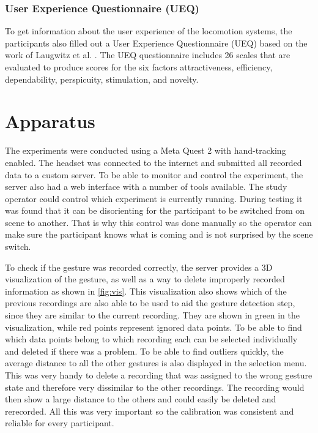\subsubsection{User Experience Questionnaire (UEQ)}
To get information about the user experience of the locomotion systems, the participants also filled out a User Experience Questionnaire (UEQ) based on the work of Laugwitz et al. \cite{Laugwitz2008}. The UEQ questionnaire includes 26 scales that are evaluated to produce scores for the six factors attractiveness, efficiency, dependability, perspicuity, stimulation, and novelty.

\section{Apparatus}

The experiments were conducted using a Meta Quest 2 with hand-tracking enabled. The headset was connected to the internet and submitted all recorded data to a custom server. To be able to monitor and control the experiment, the server also had a web interface with a number of tools available. The study operator could control which experiment is currently running. During testing it was found that it can be disorienting for the participant to be switched from on scene to another. That is why this control was done manually so the operator can make sure the participant knows what is coming and is not surprised by the scene switch.

To check if the gesture was recorded correctly, the server provides a 3D visualization of the gesture, as well as a way to delete improperly recorded information as shown in \ref{fig:vis}. This visualization also shows which of the previous recordings are also able to be used to aid the gesture detection step, since they are similar to the current recording. They are shown in green in the visualization, while red points represent ignored data points. To be able to find which data points belong to which recording each can be selected individually and deleted if there was a problem. To be able to find outliers quickly, the average distance to all the other gestures is also displayed in the selection menu. This was very handy to delete a recording that was assigned to the wrong gesture state and therefore very dissimilar to the other recordings. The recording would then show a large distance to the others and could easily be deleted and rerecorded. All this was very important so the calibration was consistent and reliable for every participant.

